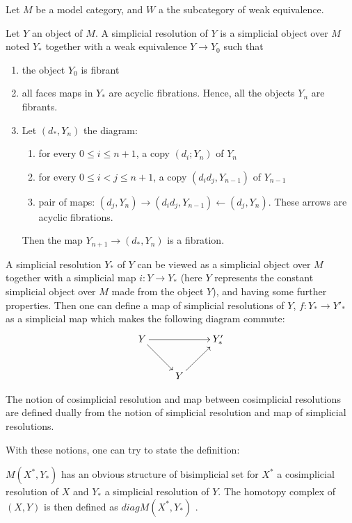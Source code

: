 \begin{refsection}
Let $M$ be a model category, and $W$ a the subcategory of weak equivalence.

\begin{defin}
Let $Y$ an object of $M$. A simplicial resolution of $Y$ is a simplicial object over $M$ noted $Y_*$ together with a weak equivalence $Y \rightarrow Y_0$ such that
\begin{enumerate}
\item the object $Y_0$ is fibrant
\item all faces maps in $Y_*$ are acyclic fibrations. Hence, all the objects $Y_n$ are fibrants.
\item Let $(d_*, Y_n)$ the diagram:
\begin{enumerate}
\item for every $0 \le i \le n+1$, a copy $(d_i; Y_n)$ of $Y_n$
\item for every $0 \le i < j \le n+1$, a copy $(d_id_j,Y_{n-1})$ of $Y_{n-1}$
\item pair of maps: $(d_j, Y_n) \rightarrow (d_id_j,Y_{n-1}) \leftarrow (d_j, Y_n)$. These arrows are acyclic fibrations. 
\end{enumerate}
Then the map $Y_{n+1} \rightarrow (d_*,Y_n)$ is a fibration.
\end{enumerate}
\end{defin}

\begin{defin}
A simplicial resolution $Y_*$ of $Y$ can be viewed as a simplicial object over $M$ together with a simplicial map $i:Y \rightarrow Y_*$ (here $Y$ represents the constant simplicial object over $M$ made from the object $Y$), and having some further properties. Then one can define a map of simplicial resolutions of $Y$, $f:Y_* \rightarrow {Y'}_*$ as a simplicial map which makes the following diagram commute:
\[ \xymatrix{Y \ar[rr] \ar[dr] && {Y'_*} \\ & Y \ar[ur]} \]
\end{defin}


\begin{defin}
The notion of cosimplicial resolution and map between cosimplicial resolutions are defined dually from the notion of simplicial resolution and map of simplicial resolutions.
\end{defin}

With these notions, one can try to state the definition:

\begin{defin}
$M(X^*,Y_*)$ has an obvious structure of bisimplicial set for $X^*$ a cosimplicial resolution of $X$ and $Y_*$ a simplicial resolution of $Y$. The homotopy complex of $(X,Y)$ is then defined as $diag M(X^*,Y_*)$ .
\end{defin}


\end{refsection}
